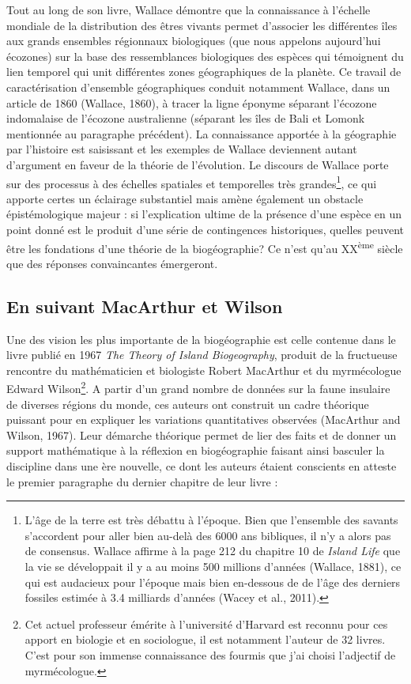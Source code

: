 Tout au long de son livre, Wallace démontre que la connaissance à
l'échelle mondiale de la distribution des êtres vivants permet
d'associer les différentes îles aux grands ensembles régionnaux
biologiques (que nous appelons aujourd'hui écozones) sur la base des
ressemblances biologiques des espèces qui témoignent du lien temporel
qui unit différentes zones géographiques de la planète. Ce travail de
caractérisation d'ensemble géographiques conduit notamment Wallace, dans
un article de 1860 (Wallace, 1860), à tracer la ligne éponyme séparant
l'écozone indomalaise de l'écozone australienne (séparant les îles de
Bali et Lomonk mentionnée au paragraphe précédent). La connaissance
apportée à la géographie par l'histoire est saisissant et les exemples
de Wallace deviennent autant d'argument en faveur de la théorie de
l'évolution. Le discours de Wallace porte sur des processus à des
échelles spatiales et temporelles très grandes\footnote{L'âge de la
  terre est très débattu à l'époque. Bien que l'ensemble des savants
  s'accordent pour aller bien au-delà des 6000 ans bibliques, il n'y a
  alors pas de consensus. Wallace affirme à la page 212 du chapitre 10
  de \emph{Island Life} que la vie se développait il y a au moins 500
  millions d'années (Wallace, 1881), ce qui est audacieux pour l'époque
  mais bien en-dessous de de l'âge des derniers fossiles estimée à 3.4
  milliards d'années (Wacey et al., 2011).}, ce qui apporte certes un
éclairage substantiel mais amène également un obstacle épistémologique
majeur : si l'explication ultime de la présence d'une espèce en un point
donné est le produit d'une série de contingences historiques, quelles
peuvent être les fondations d'une théorie de la biogéographie? Ce n'est
qu'au XX\textsuperscript{ème} siècle que des réponses convaincantes
émergeront.

\subsection*{En suivant MacArthur et
Wilson}\label{en-suivant-macarthur-et-wilson}

Une des vision les plus importante de la biogéographie est celle
contenue dans le livre publié en 1967 \emph{The Theory of Island
Biogeography}, produit de la fructueuse rencontre du mathématicien et
biologiste Robert MacArthur et du myrmécologue Edward Wilson\footnote{Cet
  actuel professeur émérite à l'université d'Harvard est reconnu pour
  ces apport en biologie et en sociologue, il est notamment l'auteur de
  32 livres. C'est pour son immense connaissance des fourmis que j'ai
  choisi l'adjectif de myrmécologue.}. A partir d'un grand nombre de
données sur la faune insulaire de diverses régions du monde, ces auteurs
ont construit un cadre théorique puissant pour en expliquer les
variations quantitatives observées (MacArthur and Wilson, 1967). Leur
démarche théorique permet de lier des faits et de donner un support
mathématique à la réflexion en biogéographie faisant ainsi basculer la
discipline dans une ère nouvelle, ce dont les auteurs étaient conscients
en atteste le premier paragraphe du dernier chapitre de leur livre :

